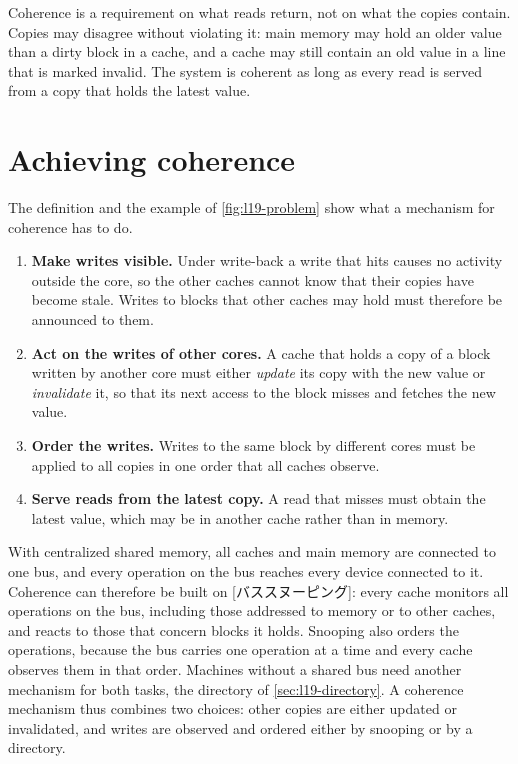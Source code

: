 \documentclass[../main.tex]{subfiles}
\begin{document}
\begin{note}
  Coherence is a requirement on what reads return, not on what the copies
  contain.  Copies may disagree without violating it: main memory may hold an
  older value than a dirty block in a cache, and a cache may still contain an
  old value in a line that is marked invalid.  The system is coherent as long
  as every read is served from a copy that holds the latest value.
\end{note}

\section{Achieving coherence}
\label{sec:l19-achieving}

The definition and the example of \cref{fig:l19-problem} show what a
mechanism for coherence has to do.
\begin{enumerate}
  \item \textbf{Make writes visible.}  Under write-back a write that hits
    causes no activity outside the core, so the other caches cannot know that
    their copies have become stale.  Writes to blocks that other caches may
    hold must therefore be announced to them.
  \item \textbf{Act on the writes of other cores.}  A cache that holds a
    copy of a block written by another core must either \emph{update} its copy
    with the new value or \emph{invalidate} it, so that its next access to the
    block misses and fetches the new value.
  \item \textbf{Order the writes.}  Writes to the same block by different
    cores must be applied to all copies in one order that all caches
    observe.
  \item \textbf{Serve reads from the latest copy.}  A read that misses must
    obtain the latest value, which may be in another cache rather than in
    memory.
\end{enumerate}

With centralized shared memory, all caches and main memory are connected to
one bus, and every operation on the bus reaches every device connected to
it.  Coherence can therefore be built on
[バススヌーピング]: every cache monitors all operations on
the bus, including those addressed to memory or to other caches, and reacts
to those that concern blocks it holds.  Snooping also orders the operations,
because the bus carries one operation at a time and every cache observes them
in that order.  Machines without a shared bus need another mechanism for
both tasks, the directory of \cref{sec:l19-directory}.  A coherence mechanism
thus combines two choices: other copies are either updated or invalidated,
and writes are observed and ordered either by snooping or by a directory.
\end{document}
